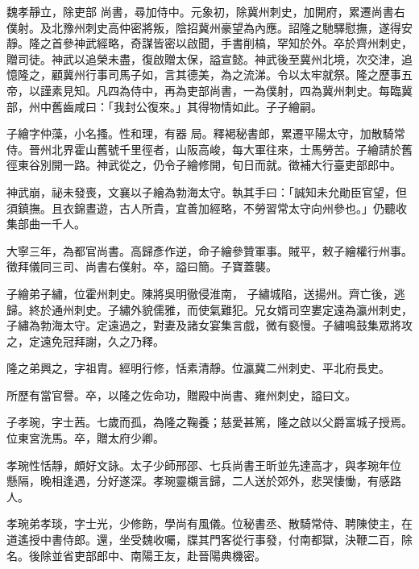 \begin{pinyinscope}
 魏孝靜立，除吏部
 尚書，尋加侍中。元象初，除冀州刺史，加開府，累遷尚書右僕射。及北豫州刺史高仲密將叛，陰招冀州豪望為內應。詔隆之馳驛慰撫，遂得安靜。隆之首參神武經略，奇謀皆密以啟聞，手書削槁，罕知於外。卒於齊州刺史，贈司徒。神武以追榮未盡，復啟贈太保，謚宣懿。神武後至冀州北境，次交津，追憶隆之，顧冀州行事司馬子如，言其德美，為之流涕。令以太牢就祭。隆之歷事五帝，以謹素見知。凡四為侍中，再為吏部尚書，一為僕射，四為冀州刺史。每臨冀部，州中舊齒咸曰：「我封公復來。」其得物情如此。子子繪嗣。



 子繪字仲藻，小名搔。性和理，有器
 局。釋褐秘書郎，累遷平陽太守，加散騎常侍。晉州北界霍山舊號千里徑者，山阪高峻，每大軍往來，士馬勞苦。子繪請於舊徑東谷別開一路。神武從之，仍令子繪修開，旬日而就。徵補大行臺吏部郎中。



 神武崩，祕未發喪，文襄以子繪為勃海太守。執其手曰：「誠知未允勛臣官望，但須鎮撫。且衣錦晝遊，古人所貴，宜善加經略，不勞習常太守向州參也。」仍聽收集部曲一千人。



 大寧三年，為都官尚書。高歸彥作逆，命子繪參贊軍事。賊平，敕子繪權行州事。徵拜儀同三司、尚書右僕射。卒，謚曰簡。子寶蓋襲。



 子繪弟子繡，位霍州刺史。陳將吳明徹侵淮南，
 子繡城陷，送揚州。齊亡後，逃歸。終於通州刺史。子繡外貌儒雅，而使氣難犯。兄女婿司空婁定遠為瀛州刺史，子繡為勃海太守。定遠過之，對妻及諸女宴集言戲，微有褻慢。子繡鳴鼓集眾將攻之，定遠免冠拜謝，久之乃釋。



 隆之弟興之，字祖胄。經明行修，恬素清靜。位瀛冀二州刺史、平北府長史。



 所歷有當官譽。卒，以隆之佐命功，贈殿中尚書、雍州刺史，謚曰文。



 子孝琬，字士茜。七歲而孤，為隆之鞠養；慈愛甚篤，隆之啟以父爵富城子授焉。位東宮洗馬。卒，贈太府少卿。



 孝琬性恬靜，頗好文詠。太子少師邢邵、七兵尚書王昕並先達高才，與孝琬年位
 懸隔，晚相逢遇，分好遂深。孝琬靈櫬言歸，二人送於郊外，悲哭悽慟，有感路人。



 孝琬弟孝琰，字士光，少修飭，學尚有風儀。位秘書丞、散騎常侍、聘陳使主，在道遙授中書侍郎。還，坐受魏收囑，牒其門客從行事發，付南都獄，決鞭二百，除名。後除並省吏部郎中、南陽王友，赴晉陽典機密。




\end{pinyinscope}
